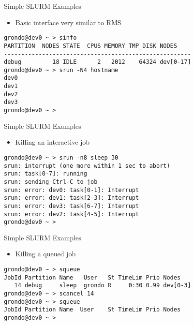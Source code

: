 \documentclass[%
letterpaper,
pdf,
colorBG,
slideColor,
alienglow
]{prosper}
\begin{document}
\begin{slide}{Simple SLURM Examples}
\begin{itemize}
\item Basic interface very similar to RMS
\end{itemize}
\renewcommand{\baselinestretch}{0.8}
\footnotesize
\begin{verbatim}
grondo@dev0 ~ > sinfo
PARTITION  NODES STATE  CPUS MEMORY TMP_DISK NODES
------------------------------------------------------
debug         18 IDLE      2   2012    64324 dev[0-17]
grondo@dev0 ~ > srun -N4 hostname
dev0
dev1
dev2
dev3
grondo@dev0 ~ >
\end{verbatim}
\renewcommand{\baselinestretch}{1.0}
\end{slide}

\begin{slide}{Simple SLURM Examples}
\begin{itemize}
\item Killing an interactive job
\end{itemize}
\renewcommand{\baselinestretch}{0.8}
\footnotesize
\begin{verbatim}
grondo@dev0 ~ > srun -n8 sleep 30
srun: interrupt (one more within 1 sec to abort)
srun: task[0-7]: running
srun: sending Ctrl-C to job
srun: error: dev0: task[0-1]: Interrupt
srun: error: dev1: task[2-3]: Interrupt
srun: error: dev3: task[6-7]: Interrupt
srun: error: dev2: task[4-5]: Interrupt
grondo@dev0 ~ >
\end{verbatim}
\renewcommand{\baselinestretch}{1.0}
\end{slide}

\begin{slide}{Simple SLURM Examples}
\begin{itemize}
\item Killing a queued job
\end{itemize}
\renewcommand{\baselinestretch}{0.8}
\footnotesize
\begin{verbatim}
grondo@dev0 ~ > squeue
JobId Partition Name   User   St TimeLim Prio Nodes
   14 debug     sleep  grondo R     0:30 0.99 dev[0-3]
grondo@dev0 ~ > scancel 14
grondo@dev0 ~ > squeue
JobId Partition Name  User    St TimeLim Prio Nodes
grondo@dev0 ~ >
\end{verbatim}
\renewcommand{\baselinestretch}{1.0}
\end{slide}
\end{document}

